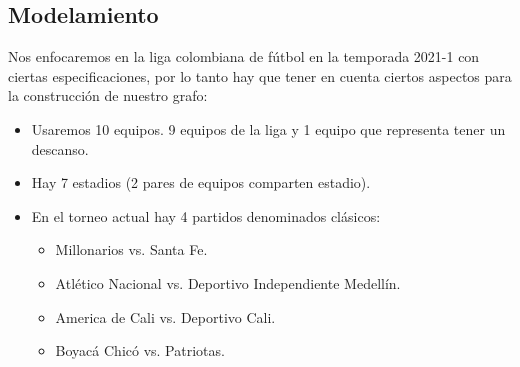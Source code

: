 \documentclass[11pt]{article}
\begin{document}
\begin{multicols}{2}
        \section{Modelamiento}
            Nos enfocaremos en la liga colombiana de fútbol en la temporada 2021-1 con ciertas especificaciones, por lo tanto hay que 
            tener en cuenta ciertos aspectos para la construcción de nuestro grafo:
            \begin{itemize}
                \item  Usaremos 10 equipos. 9 equipos de la liga y 1 equipo que representa tener un descanso.
                \item  Hay 7 estadios (2 pares de equipos comparten estadio).
                \item  En el torneo actual hay 4 partidos denominados clásicos:
                \begin{itemize}
                    \item  Millonarios vs. Santa Fe.
                    \item  Atlético Nacional vs. Deportivo Independiente Medellín.
                    \item America de Cali vs. Deportivo Cali.
                    \item  Boyacá Chicó vs. Patriotas.
                \end{itemize}
            \end{itemize}


\end{multicols}
\end{document}
